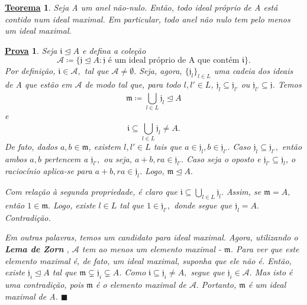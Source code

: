 \documentclass{article}
\newtheorem*{theorem*}{\underline{Teorema}}
\newtheorem*{proof*}{\underline{Prova}}
\renewcommand\qedsymbol{$\blacksquare$}
\begin{document}
\begin{theorem*}
  Seja A um anel não-nulo. Então, todo ideal próprio de A está contido num ideal maximal. Em particular, todo anel
  não nulo tem pelo menos um ideal maximal.
\end{theorem*}
\begin{proof*}
  Seja \(\mathfrak{i}\trianglelefteq A\) e defina a coleção 
  \[
    \mathcal{A} \coloneqq \{\mathfrak{j}\trianglelefteq A: \mathfrak{j} \text{ é um ideal próprio de A que contém }\mathfrak{i}\}.
  \]
  Por definição, \(\mathfrak{i}\in \mathcal{A},\) tal que \(\mathcal{A}\neq\emptyset.\) Seja, agora, \(\{\mathfrak{j}_{l}\}_{l\in L}\) uma cadeia
  dos ideais de A que estão em \(\mathcal{A}\) de modo tal que, para todo \(l, l'\in L\),
  \(\mathfrak{j}_{l}\subseteq \mathfrak{j}_{l'}\) ou \(\mathfrak{j}_{l'}\subseteq \mathfrak{j}\). Temos 
  \[
    \mathfrak{m}\coloneqq \bigcup_{l\in L}^{}\mathfrak{j}_{l}\trianglelefteq A
  \]
  e 
  \[
    \mathfrak{i}\subseteq \bigcup_{l\in L}^{}\mathfrak{j}_{l}\neq A.
  \]
  De fato, dados \(a, b\in \mathfrak{m}\), existem \(l, l'\in L\) tais que \(a\in \mathfrak{j}_{l}, b\in \mathfrak{j}_{l'}\).
  Caso \(\mathfrak{j}_{l}\subseteq \mathfrak{j}_{l'},\) então ambos \(a, b\) pertencem a \(\mathfrak{j}_{l'},\) ou seja, \(a + b, ra\in \mathfrak{j}_{l'}.\) Caso
  seja o oposto e \(\mathfrak{j}_{l'}\subseteq \mathfrak{j}_{l}\), o raciocínio aplica-se para \(a + b, ra\in \mathfrak{j}_{l}\). Logo, \(\mathfrak{m}\trianglelefteq A.\)

  Com relação à segunda propriedade, é claro que \(\mathfrak{i}\subseteq \bigcup_{l\in L}^{}\mathfrak{j}_{l}.\) Assim, se
  \(\mathfrak{m} = A,\) então \(1\in \mathfrak{m}.\) Logo, existe \(l\in L\) tal que \(1\in \mathfrak{j}_{l'},\) donde segue que 
  \(\mathfrak{j}_{l} = A.\) Contradição.

  Em outras palavras, temos um candidato para ideal maximal. Agora, utilizando o \textbf{Lema de Zorn} , \(\mathcal{A}\) tem
  ao menos um elemento maximal - \(\mathfrak{m}\). Para ver que este elemento maximal é, de fato, um ideal maximal, suponha que ele não é. Então, existe \(\mathfrak{j}_{i} \trianglelefteq A\) tal que 
  \(\mathfrak{m}\subsetneq \mathfrak{j}_{i} \subsetneq A\). Como \(\mathfrak{i}\subseteq \mathfrak{j}_{i}\neq A,\) segue que \(\mathfrak{j}_{i}\in \mathcal{A}.\) Mas isto é uma contradição,
  pois \(\mathfrak{m}\) é o elemento maximal de \(\mathcal{A}.\) Portanto, \(\mathfrak{m}\) é um ideal maximal de A. \qedsymbol
\end{proof*}
\end{document}
